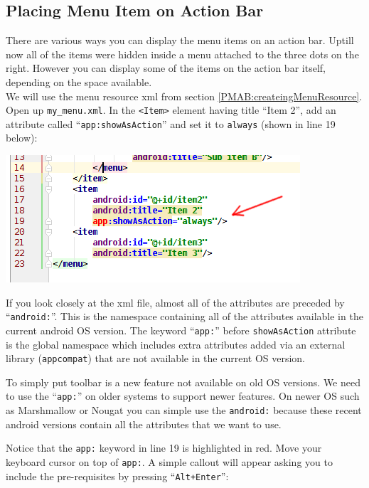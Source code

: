 \subsection{Placing Menu Item on Action Bar}
There are various ways you can display the menu items on an action bar. Uptill now all of the items were hidden inside a menu attached to the three dots on the right. However you can display some of the items on the action bar itself, depending on the space available.\\

We will use the menu resource xml from section \ref{PMAB:createingMenuResource}. Open up \texttt{my\_menu.xml}. In the \texttt{<Item>} element having title ``Item 2'', add an attribute called ``\texttt{app:showAsAction}'' and set it to \texttt{always} (shown in line 19 below):

\begin{center}
	\includegraphics[scale=0.4]{chapters/ch07/images/51}
\end{center}

If you look closely at the xml file, almost all of the attributes are preceded by ``\texttt{android:}''. This is the namespace containing all of the attributes available in the current android OS version. The keyword ``\texttt{app:}'' before \texttt{showAsAction} attribute is the global namespace which includes extra attributes added via an external library (\texttt{appcompat}) that are not available in the current OS version. 

To simply put toolbar is a new feature not available on old OS versions. We need to use the ``\texttt{app:}'' on older systems to support newer features. On newer OS such as Marshmallow or Nougat you can simple use the \texttt{android:} because these recent android versions contain all the attributes that we want to use.

Notice that the \texttt{app:} keyword in line 19 is highlighted in red. Move your keyboard cursor on top of \texttt{app:}. A simple callout will appear asking you to include the pre-requisites by pressing ``\texttt{Alt+Enter}'':

